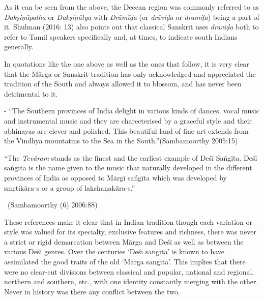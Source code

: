 As it can be seen from the above, the Deccan region was commonly referred to as \textit{Dakṣiṇāpatha} or \textit{Dakṣiṇātya} with \textit{Drāmīḍa} (or \textit{drāviḍa} or \textit{dramiḷa}) being a part of it. Shulman (2016: 13) also points out that classical Sanskrit uses \textit{draviḍa} both to refer to Tamil speakers specifically and, at times, to indicate south Indians generally.

In quotations like the one above as well as the ones that follow, it is very clear that the Mārga or Sanskrit tradition has only acknowledged and appreciated the tradition of the South and always allowed it to blossom, and has never been detrimental to it.

\begin{myquote}
 - “The Southern provinces of India delight in various kinds of dances, vocal music and instrumental music and they are charecterised by a graceful style and their abhinayas are clever and polished. This beautiful land of fine art extends from the Vindhya mountatins to the Sea in the South.”\hfill (Sambamoorthy 2005:15)
\end{myquote}

\begin{myquote}
“The \textit{Tevāram} stands as the finest and the earliest example of Deśī Sańgīta. Deśī sańgīta is the name given to the music that naturally developed in the different provinces of India as opposed to Mārgī sańgīta which was developed by smṛtikāra-s or a group of lakshaņakāra-s.”

~\hfill (Sambamoorthy (6) 2006:88)
\end{myquote}

These references make it clear that in Indian tradition though each variation or style was valued for its specialty, exclusive features and richness, there was never a strict or rigid demarcation between Mārga and Deśī as well as between the various Deśī genres. Over the centuries ‘Deśī sangīta’ is known to have assimilated the good traits of the old ‘Mārga sangīta’. This implies that there were no clear-cut divisions between classical and popular, national and regional, northern and southern, etc., with one identity constantly merging with the other. Never in history was there any conflict between the two.

